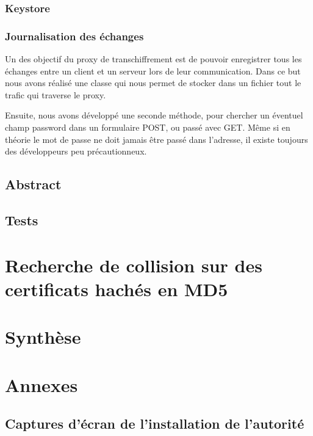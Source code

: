 \documentclass[a4paper,11pt,french]{report}
\begin{document}
\subsection{Keystore}


\subsection{Journalisation des échanges}
Un des objectif du proxy de transchiffrement est de pouvoir enregistrer tous les 
échanges entre un client et un serveur lors de leur communication. Dans ce but nous
avons réalisé une classe qui nous permet de stocker dans un fichier tout le trafic qui traverse le proxy.

Ensuite, nous avons développé une seconde méthode, pour chercher un éventuel champ password
dans un formulaire POST, ou passé avec GET. Même si en théorie le mot de passe ne doit jamais
être passé dans l'adresse, il existe toujours des développeurs peu précautionneux.
\section{Abstract}


\section{Tests}

\chapter{Recherche de collision sur des certificats hachés en MD5}

\chapter{Synthèse}

\chapter{Annexes}
\section{Captures d'écran de l'installation de l'autorité}
\end{document}
